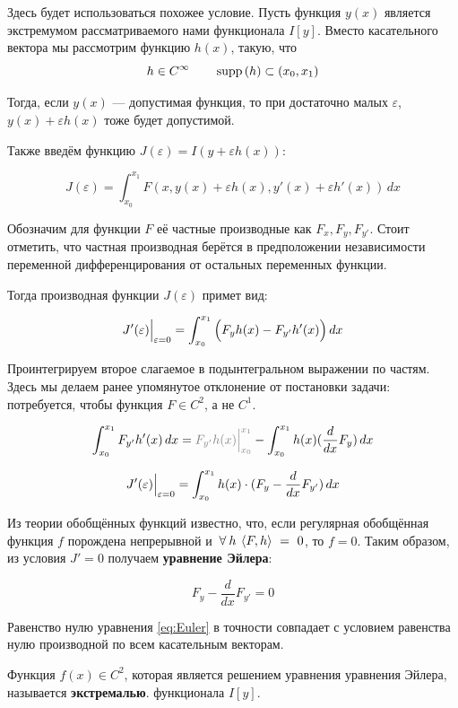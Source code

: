 \documentclass[12pt]{article}
\begin{document}
			Здесь будет использоваться похожее условие. Пусть функция $y(x)$ является экстремумом 
			рассматриваемого нами функционала $I[y]$. Вместо касательного вектора мы рассмотрим
			функцию $h(x)$, такую, что
			$$h \in C^{\infty} \qquad \,\text{supp}\,(h) \subset (x_0, x_1)$$
	
			Тогда, если $y(x)$ --- допустимая функция, то при достаточно малых $\varepsilon$,
			$y(x) + \varepsilon h(x)$ тоже будет допустимой.
			
			Также введём функцию $J(\varepsilon) = I(y + \varepsilon h(x))$:

			$$J(\varepsilon) = \int_{x_0}^{x_1} F(x, y(x) + \varepsilon h(x), y'(x) + \varepsilon h'(x))\,dx$$

			Обозначим для функции $F$ её частные производные как $F_x, F_y, F_{y'}$. Стоит отметить, что
			частная производная берётся в предположении независимости переменной дифференцирования от
			остальных переменных функции.

			Тогда производная функции $J(\varepsilon)$ примет вид:
	
			$$J'(\varepsilon)\Big|_{\varepsilon = 0}^{} = \int_{x_0}^{x_1} \Big( F_{y}h(x) - F_{y'}h'(x) \Big)\,dx$$
	
			Проинтегрируем второе слагаемое в подынтегральном выражении по частям. Здесь мы делаем ранее
			упомянутое отклонение от постановки задачи: потребуется, чтобы функция $F \in C^2$, а не $C^1$.

			$$\int_{x_0}^{x_1} F_{y'}h'(x) \,dx = \off{F_{y'}h(x) \lims{x_0}{x_1}} - \int_{x_0}^{x_1} h(x)(\frac{d}{dx} F_y)\,dx$$

			$$J'(\varepsilon)\Big|_{\varepsilon = 0}^{} = \int_{x_0}^{x_1}h(x)\cdot(F_y - \frac{d}{dx}F_{y'}) \,dx$$


			Из теории обобщённых функций известно, что, если регулярная обобщённая функция $f$ порождена
			непрерывной и $\forall h\:\scal{F}{h}~=~0$, то $f = 0$. Таким образом, из условия $J' = 0$
			получаем \textbf{уравнение Эйлера}:

			\begin{equation} \label{eq:Euler}
				F_y - \frac{d}{dx}F_{y'} = 0 
			\end{equation}
	
			Равенство нулю уравнения \ref{eq:Euler} в точности совпадает с условием равенства нулю
			производной по всем касательным векторам.
	
			\begin{defi}
				Функция $f(x) \in C^2$, которая является решением уравнения уравнения Эйлера, называется
				\textbf{экстремалью}.
				функционала $I[y]$.
			\end{defi}
			
\end{document}
